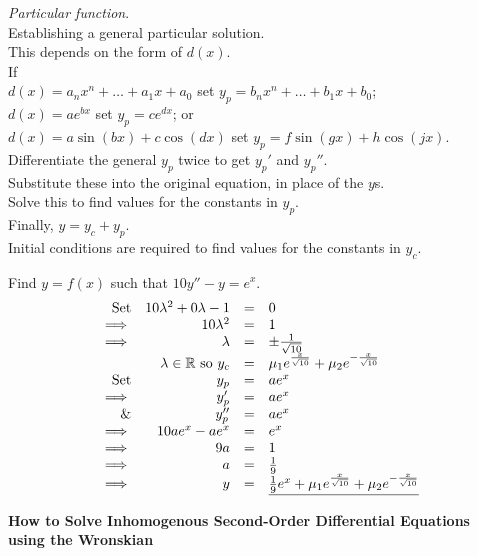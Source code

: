 \documentclass[11pt,a4paper]{article}
\begin{document}
\textit{Particular function}.\\
Establishing a general particular solution.\\
This depends on the form of $d(x)$.\\
If\\
\-\hspace{4ex}$d(x) = a_nx^n + \dots + a_1x + a_0$ set $y_p = b_nx^n + \dots + b_1x+b_0$;\\
\-\hspace{4ex}$d(x) = ae^{bx}$ set $y_p = ce^{dx}$; or\\
\-\hspace{4ex}$d(x) = a\sin(bx) + c\cos(dx)$ set $y_p = f\sin(gx) + h\cos(jx)$.
Differentiate the general $y_p$ twice to get $y_p'$ and $y_p''$.\\
Substitute these into the original equation, in place of the $y$s.\\
Solve this to find values for the constants in $y_p$.\\
Finally, $y  =y_c + y_p$.\\
Initial conditions are required to find values for the constants in $y_c$.\\

\subtitle{Example}
Find $y = f(x)$ such that $10y'' - y = e^x$.\\
\[\begin{array}{rrcl}
\mathrm{Set}& 10\lambda^2 + 0\lambda - 1 &=& 0\\
\implies& 10\lambda^2 &=& 1\\
\implies& \lambda &=& \pm \frac{1}{\sqrt{10}}\\
&\lambda \in \mathbb{R}\ \mathrm{so}\ y_c &=& \mu_1 e^{\frac{x}{\sqrt{10}}} + \mu_2 e^{-\frac{x}{\sqrt{10}}}\\
\mathrm{Set}& y_p &=& ae^x\\
\implies& y_p' &=& ae^x\\
\&& y_p'' &=& ae^x\\
\implies& 10ae^x - ae^x &=& e^x\\
\implies& 9a &=& 1\\
\implies& a &=& \frac{1}{9}\\
\implies& y &=& \underline{\frac{1}{9}e^x +  \mu_1 e^{\frac{x}{\sqrt{10}}} + \mu_2 e^{-\frac{x}{\sqrt{10}}}}
\end{array}\]

\newpage\textbf{How to Solve Inhomogenous Second-Order Differential Equations using the Wronskian}\\
\end{document}
